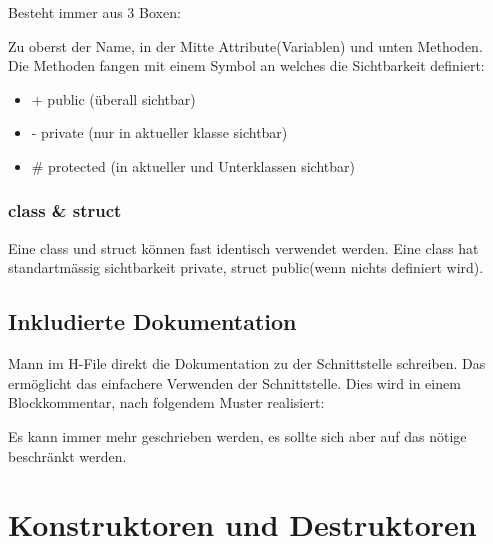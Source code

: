 Besteht immer aus 3 Boxen:

\begin{center}
\end{center}

Zu oberst der Name, in der Mitte Attribute(Variablen) und unten Methoden.\\
Die Methoden fangen mit einem Symbol an welches die Sichtbarkeit definiert:
\begin{itemize}[itemsep=1pt, parsep=0pt]
    \item + public (überall sichtbar)
    \item - private (nur in  aktueller klasse sichtbar)
    \item \# protected (in aktueller und Unterklassen sichtbar)
\end{itemize}


\subsubsection{class \& struct}

Eine class und struct können fast identisch verwendet werden. 
Eine class hat standartmässig sichtbarkeit private, struct public(wenn nichts definiert wird).


\subsection{Inkludierte Dokumentation}

Mann im H-File direkt die Dokumentation zu der Schnittstelle schreiben. 
Das ermöglicht das einfachere Verwenden der Schnittstelle.
Dies wird in einem Blockkommentar, nach folgendem Muster realisiert:



Es kann immer mehr geschrieben werden, es sollte sich aber auf das nötige beschränkt werden.

\section{Konstruktoren und Destruktoren}

